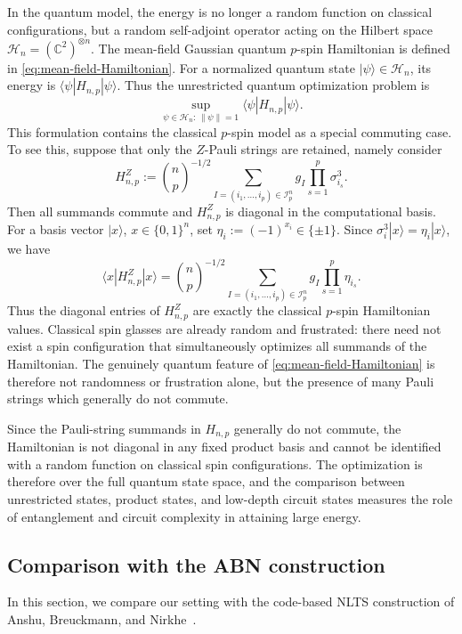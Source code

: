 \documentclass[12pt]{article}
\newcommand{\C}{\mathbb{C}}
\newcommand{\mcH}{\mathcal{H}}
\newcommand{\mcI}{\mathcal{I}}
\begin{document}
\begin{appendix}
In the quantum model, the energy is no longer a random function on classical
configurations, but a random self-adjoint operator acting on the Hilbert space $\mcH_n=(\C^2)^{\otimes n}$. The mean-field Gaussian quantum \(p\)-spin Hamiltonian is defined in \eqref{eq:mean-field-Hamiltonian}. For a normalized quantum state \(|\psi\rangle\in\mcH_n\), its energy is $\langle \psi|H_{n,p}|\psi\rangle$. Thus the unrestricted quantum optimization problem is
\[
    \sup_{\psi\in\mcH_n:\,\|\psi\|=1}
    \langle \psi|H_{n,p}|\psi\rangle .
\]
This formulation contains the classical \(p\)-spin model as a special
commuting case. To see this, suppose that only the \(Z\)-Pauli strings are
retained, namely consider
\[
    H_{n,p}^{Z}
    :=
    \binom np^{-1/2}
    \sum_{I=(i_1,\dots,i_p)\in\mcI_p^n}
    g_I
    \prod_{s=1}^p \sigma_{i_s}^3 .
\]
Then all summands commute and \(H_{n,p}^{Z}\) is diagonal in the computational
basis. For a basis vector \(|x\rangle\), \(x\in\{0,1\}^n\), set $\eta_i:=(-1)^{x_i}\in\{\pm1\}$. Since \(\sigma_i^3|x\rangle=\eta_i|x\rangle\), we have
\[
    \langle x|H_{n,p}^{Z}|x\rangle
    =
    \binom np^{-1/2}
    \sum_{I=(i_1,\dots,i_p)\in\mcI_p^n}
    g_I
    \prod_{s=1}^p \eta_{i_s}.
\]
Thus the diagonal entries of \(H_{n,p}^{Z}\) are exactly the classical
\(p\)-spin Hamiltonian values. Classical spin glasses are already random and frustrated: there need not exist a spin configuration that simultaneously optimizes all summands of the Hamiltonian. The genuinely quantum feature of
\eqref{eq:mean-field-Hamiltonian} is therefore not randomness or frustration
alone, but the presence of many Pauli strings which generally do not commute.

Since the Pauli-string summands in \(H_{n,p}\) generally do not commute, the
Hamiltonian is not diagonal in any fixed product basis and cannot be identified
with a random function on classical spin configurations. The optimization is
therefore over the full quantum state space, and the comparison between
unrestricted states, product states, and low-depth circuit states measures the
role of entanglement and circuit complexity in attaining large energy.


\subsection{Comparison with the ABN construction}
\label{ssec:ABN}
In this section, we compare our setting with the code-based NLTS construction of Anshu,
Breuckmann, and Nirkhe~\cite{anshu2023nlts}. 


\end{appendix}
\end{document}
